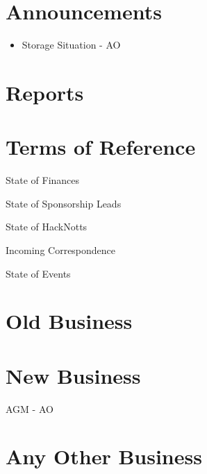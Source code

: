 \documentclass[11pt,hacksoc,agenda]{meetingmins}
\begin{document}
\maketitle

\section{Announcements}
\begin{itemize}
  \item Storage Situation - AO
\end{itemize}

\section{Reports}

\section{Terms of Reference}
\begin{items}
\item {State of Finances}
\item {State of Sponsorship Leads}
\item {State of HackNotts}
\item {Incoming Correspondence}
\item {State of Events}
\end{items}

\section{Old Business}

\section{New Business}
\begin{items}
\item AGM - AO
\end{items}

\section{Any Other Business}

\vspace{1em}
\end{document}
